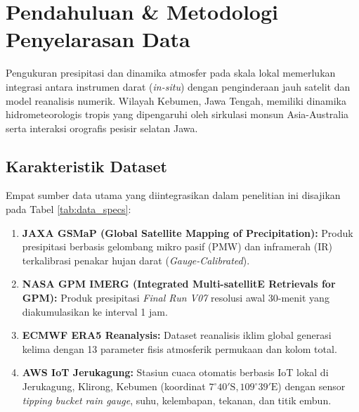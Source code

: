 \documentclass[11pt,a4paper]{article}
\begin{document}
\section{Pendahuluan \& Metodologi Penyelarasan Data}
Pengukuran presipitasi dan dinamika atmosfer pada skala lokal memerlukan integrasi antara instrumen darat (\textit{in-situ}) dengan penginderaan jauh satelit dan model reanalisis numerik. Wilayah Kebumen, Jawa Tengah, memiliki dinamika hidrometeorologis tropis yang dipengaruhi oleh sirkulasi monsun Asia-Australia serta interaksi orografis pesisir selatan Jawa.

\subsection{Karakteristik Dataset}
Empat sumber data utama yang diintegrasikan dalam penelitian ini disajikan pada Tabel \ref{tab:data_specs}:
\begin{enumerate}[leftmargin=*]
    \item \textbf{JAXA GSMaP (Global Satellite Mapping of Precipitation):} Produk presipitasi berbasis gelombang mikro pasif (PMW) dan inframerah (IR) terkalibrasi penakar hujan darat (\textit{Gauge-Calibrated}).
    \item \textbf{NASA GPM IMERG (Integrated Multi-satellitE Retrievals for GPM):} Produk presipitasi \textit{Final Run V07} resolusi awal 30-menit yang diakumulasikan ke interval 1 jam.
    \item \textbf{ECMWF ERA5 Reanalysis:} Dataset reanalisis iklim global generasi kelima dengan 13 parameter fisis atmosferik permukaan dan kolom total.
    \item \textbf{AWS IoT Jerukagung:} Stasiun cuaca otomatis berbasis IoT lokal di Jerukagung, Klirong, Kebumen (koordinat $7^\circ 40'\text{S}, 109^\circ 39'\text{E}$) dengan sensor \textit{tipping bucket rain gauge}, suhu, kelembapan, tekanan, dan titik embun.
\end{enumerate}
\end{document}
